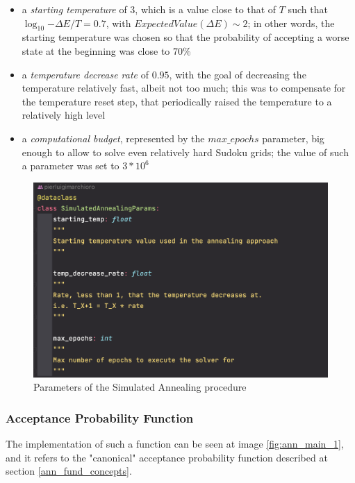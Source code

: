 \begin{itemize}
    \item a \textit{starting temperature} of $3$, which is a value close to that of $T$ such that $\log_{10}{-\Delta{E} / T} = 0.7$, with $ExpectedValue(\Delta{E}) \sim 2$; in other words, the starting temperature was chosen so that the probability of accepting a worse state at the beginning was close to 70\%

    \item a \textit{temperature decrease rate} of $0.95$, with the goal of decreasing the temperature relatively fast, albeit not too much; this was to compensate for the temperature reset step, that periodically raised the temperature to a relatively high level

    \item a \textit{computational budget}, represented by the $max\_epochs$ parameter, big enough to allow to solve even relatively hard Sudoku grids; the value of such a parameter was set to $3*10^6$
\end{itemize}

\begin{figure}[h]
    \centering
    \includegraphics[scale=0.65]{assignment-1/images/sim_ann/main-1-params.png}
    \caption{Parameters of the Simulated Annealing procedure}
    \label{fig:ann_main_2_params}
\end{figure}

\subsubsection{Acceptance Probability Function}

The implementation of such a function can be seen at image \ref{fig:ann_main_1}, and it refers to the "canonical" acceptance probability function described at section \ref{ann_fund_concepts}.

